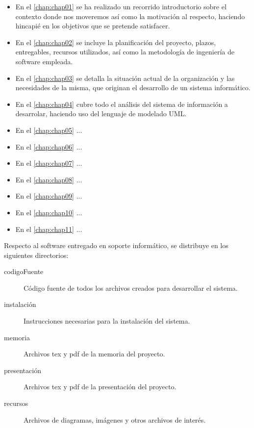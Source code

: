 \begin{itemize}
	\item En el \autoref{chap:chap01} se ha realizado un recorrido introductorio sobre el contexto donde nos moveremos así como la motivación al respecto, haciendo hincapié en los objetivos que se pretende satisfacer.
	\item En el \autoref{chap:chap02} se incluye la planificación del proyecto, plazos, entregables, recursos utilizados, así como la metodología de ingeniería de software empleada.
	\item En el \autoref{chap:chap03} se detalla la situación actual de la organización y las necesidades de la misma, que originan el desarrollo de un sistema informático.
	\item En el \autoref{chap:chap04} cubre todo el análisis del sistema de información a desarrolar, haciendo uso del lenguaje de modelado UML.
	\item En el \autoref{chap:chap05} ...
	\item En el \autoref{chap:chap06} ...
	\item En el \autoref{chap:chap07} ...
	\item En el \autoref{chap:chap08} ...
	\item En el \autoref{chap:chap09} ...
	\item En el \autoref{chap:chap10} ...
	\item En el \autoref{chap:chap11} ...
\end{itemize}

Respecto al software entregado en soporte informático, se distribuye en los siguientes directorios:

\begin{description}
	\item [codigoFuente]	Código fuente de todos los archivos creados para desarrollar el sistema.
	\item [instalación]	Instrucciones necesarias para la instalación del sistema.
	\item [memoria]	Archivos tex y pdf de la memoria del proyecto.
	\item [presentación]	Archivos tex y pdf de la presentación del proyecto.
	\item [recursos]	Archivos de diagramas, imágenes y otros archivos de interés.
\end{description}
